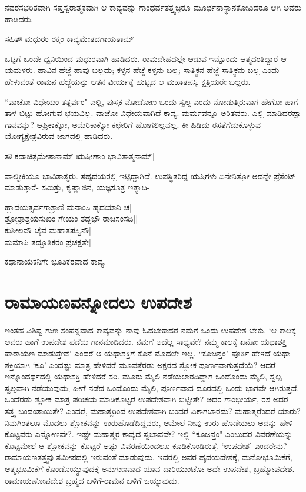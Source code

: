 ನವರಸಭರಿತವಾಗಿ ಸಪ್ತಸ್ವರಾತ್ಮಕವಾಗಿ ಆ ಕಾವ್ಯವನ್ನು ಗಾಂಧರ್ವತತ್ತ್ವಜ್ಞರೂ ಮೂರ್ಛನಾಸ್ಥಾನಕೋವಿದರೂ ಆಗಿ ಅವರು ಹಾಡಿದರು. 


\begin{shloka} 
ಸಹಿತೌ ಮಧುರಂ ರಕ್ತಂ ಕಾವ್ಯಮೇತದಗಾಯತಾಮ್‍|\label{189b}
\end{shloka}

ಒಟ್ಟಿಗೆ ಒಂದೇ ಧ್ವನಿಯಿಂದ ಮಧುರವಾಗಿ ಹಾಡಿದರು. ರಾಮದೇಹದಲ್ಲೇ ಆಡುವ ಇನ್ನೊಂದು ಆತ್ಮದಂತಿದ್ದಾರೆ ಆ ಯಮಳರು. ಹಾವಿನ ಹೆಜ್ಜೆ ಹಾವು ಬಲ್ಲದು; ಕಳ್ಳನ ಹೆಜ್ಜೆ ಕಳ್ಳನು ಬಲ್ಲ; ಸಾತ್ತ್ವಿಕನ ಹೆಜ್ಜೆ ಸಾತ್ತ್ವಿಕನು ಬಲ್ಲ ಎಂದು ಹೇಳುವಂತೆ ರಾಮನ ಹೆಜ್ಜೆಯನ್ನು ಆತನ ವೀರ್ಯಕ್ಕೆ ಹುಟ್ಟಿದ ಆ ಮಹಾತಪಸ್ವಿ ಕ್ಷತ್ರಿಯರೇ ಬಲ್ಲರು. 

``ವಾಚೋ ವಿಧೇಯಂ ತತ್ಸರ್ವಂ"\label{189a} ಎಲ್ಲಿ, ಪುಸ್ತಕ ನೋಡೋಣ ಒಂದು ಸ್ವಲ್ಪ ಎಂದು ನೋಡುತ್ತಿರುವಾಗ ಹೇಗೋ ಹಾಗೆ ತಾಳ ಬಿಟ್ಟು ಹೋಗುವ ಭಯವಿಲ್ಲ. ವಾಚೋ ವಿಧೇಯವಾಗಿದೆ ಕಾವ್ಯ. ಮರ್ಮವನ್ನೂ ಅರಿತವರು. ಎಲ್ಲಿ ಮಾಡಿದರಪ್ಪಾ ಗಾನವನ್ನು? ಆಫ್ರಿಕಾಕ್ಕೋ, ಅಮೆರಿಕಾಕ್ಕೋ ಕಛೇರಿಗೆ ಹೋಗಲಿಲ್ಲವಲ್ಲ. ಕೀ ಹಿಡಿದು ರಸತೆಗೆದುಕೊಳ್ಳುವ ಯೋಗ್ಯಕ್ಷೇತ್ರವಿರುವ ಜಾಗದಲ್ಲಿ ಹಾಡಿದರು. 

\begin{shloka} 
ತೌ ಕದಾಚಿತ್ಸಮೇತಾನಾಮ್‍ ಋಷೀಣಾಂ ಭಾವಿತಾತ್ಮನಾಮ್‍| \label{189}
\end{shloka}

ವಾಲ್ಮೀಕಿಯೂ ಭಾವಿತಾತ್ಮರು. ಸಹೃದಯರಲ್ಲಿ ಇಟ್ಟಿದ್ದಾಗಿದೆ. ಉಪಸ್ಥಿತರಿದ್ದ ಋಷಿಗಳು ಏನೇನಿತ್ತೋ ಅದನ್ನೇ ಪ್ರೆಸೆಂಟ್‍ ಮಾಡುತ್ತಾರೆ- ಸಮಿತ್ತು, ಕೃಷ್ಣಾಜಿನ, ಯಜ್ಞಸೂತ್ರ ಇತ್ಯಾದಿ- 

\begin{shloka}
ಹ್ಲಾದಯತ್ಸರ್ವಗಾತ್ರಾಣಿ ಮನಾಂಸಿ ಹೃದಯಾನಿ ಚ|\label{189c}\\ 
ಶ್ರೋತ್ರಾಶ್ರಯಸುಖಂ ಗೇಯಂ ತದ್ಬಭೌ ರಾಜಸಂಸದಿ||\\ 
ಕುಶೀಲವೌ ಚೈವ ಮಹಾತಪಸ್ವಿನೌ|\\ 
ಮಮಾಪಿ ತದ್ಭೂತಿಕರಂ ಪ್ರಚಕ್ಷತೇ||
\end{shloka}

ಕಥಾನಾಯಕನಿಗೇ ಭೂತಿಕರವಾದ ಕಾವ್ಯ. 

\section*{ರಾಮಾಯಣವನ್ನೋದಲು ಉಪದೇಶ}

ಇಂತಹ ವಿಶಿಷ್ಟ ಗುಣ ಸಂಪನ್ನವಾದ ಕಾವ್ಯವನ್ನು ನಾವು ಓದಬೇಕಾದರೆ ನಮಗೆ ಒಂದು ಉಪದೇಶ ಬೇಕು. `ಆ ಕಾಲಕ್ಕೆ ಅವರು ಹಾಗೆ ಉಪದೇಶ ಪಡೆದು ಗಾನಮಾಡಿದರು. ನಮಗೆ ಅದೆಲ್ಲ ಸಾಧ್ಯವೇ? ನಮ್ಮ ಕಾಲಕ್ಕೆ ಏನೋ ಯಥಾಶಕ್ತಿ ಪಾರಾಯಣ ಮಾಡುತ್ತೇವೆ' ಎಂದರೆ ಆ ಯಥಾಶಕ್ತಿಗೆ ಕೊನೆ ಮೊದಲೇ ಇಲ್ಲ. ``ಕೂಜನ್ತಂ" ಪೂರ್ತಿ ಹೇಳದೆ ಯಥಾ ಶಕ್ತಿಯಾಗಿ `ಕೂ' ಎಂದಷ್ಟು ಮಾತ್ರ ಹೇಳಿದರೆ ಮೂವತ್ತೆರಡು ಅಕ್ಷರದ ಶ್ಲೋಕ ಪೂರ್ಣವಾಗುತ್ತದೆಯೆ? ಆದರೆ ಇನ್ನೊಂದರ್ಥದಲ್ಲಿ ಯಥಾಸಕ್ತಿ ಹೇಳಿದರೆ ಸರಿ. ಮೂರು ಮೈಲಿ ನಡೆಯಲಾರದಿದ್ದಾಗ ಒಂದೊಂದು ಮೈಲಿ, ಸ್ವಲ್ಪ ಸ್ವಲ್ಪವಾಗಿ ನಡೆಯುವುದು; ಹೀಗೆ ನಡೆದ ಒಂದೊಂದು ಮೈಲಿ, ಪೂರ್ಣವಾದ ದೂರದಲ್ಲಿ ಒಂದು ಭಾಗವೇ ಆಗಿರುತ್ತದೆ. ಒಂದೆರಡು ಶ್ಲೋಕ ಮಾತ್ರ ಪರಿಚಯ ಮಾಡಿಕೊಟ್ಟರೆ ಉಪದೇಶವಾಗಿ ಬಿಟ್ಟೀತೇ? ಅದರ ಗಾಂಭೀರ್ಯ, ರಸ ಅದರ ತತ್ತ್ವ ಬಂದಂತಾಯಿತೇ? ಎಂದರೆ, ಮಹಾತ್ಮರಿಂದ ಉಪದೇಶವಾಗಿ ಬಂದರೆ ಏಕಾಗಬಾರದು? ಮಹಾತ್ಮರೆಂದರೆ ಯಾರು? ನಿಮಗಿಂತಲೂ ಮೊದಲು ಶ್ಲೋಕವನ್ನು ಉರುಹೊಡೆದಿದ್ದವರು, ಆಮೇಲೆ ನೀವು ಉರು ಹೊಡೆಯಲು ಅದನ್ನು ಹೇಳಿ ಕೊಟ್ಟವರು ಎನ್ನೋಣವೇ?. ಇಷ್ಟೇ ಮಹಾತ್ಮರ ಕಾವ್ಯದ ಸ್ವಭಾವವೇ? ಇಲ್ಲಿ ``ಕೂಜನ್ತಂ" ಎಂಬುದರ ವಿವರಣೆಯನ್ನು ಕೊಟ್ಟಮೇಲೆ ಆ ಶ್ಲೋಕವನ್ನು ಕೊಟ್ಟರೆ ಅಷ್ಟು ವಿವರಣೆಯಿಂದಲೂ ಕೂಡಿಕೊಂಡಿರುತ್ತೆ. `ಉಪದೇಶ' ಎಂದರೇನು? ರಾಮಾಯಣತತ್ತ್ವವು ಸಮೀಪದಲ್ಲಿ ಇರುವಂತೆ ಮಾಡುವುದು. ಇದರಲ್ಲಿ ಅವರ ಹೃದಯದೇಶಕ್ಕೆ, ಮನೋಭೂಮಿಕೆಗೆ, ಆತ್ಮಭೂಮಿಕೆಗೆ ಕೊಂಡೊಯ್ಯುವುದಕ್ಕೆ ಅನುಗುಣವಾದ ಯಾವ ದಾರಿಯುಂಟೋ ಅದೇ ಉಪದೇಶ, ಬ್ರಹ್ಮೋಪದೇಶ. ರಾಮಾಯಣೋಪದೇಶ ಬ್ರಹ್ಮದ ಬಳಿಗೆ-ರಾಮನ ಬಳಿಗೆ ಒಯ್ಯುವುದು. 
